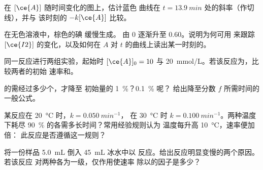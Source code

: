 \begin{exercise}[$\star\star$]\label{exo:g12:reaction-rates:9}
在 $[\ce{A}]$ 随时间变化的图上，估计蓝色
曲线在 $t = \qty{13.9}{min}$ 处的斜率（作切线），并与
该时刻的 $-k[\ce{A}]$ 比较。
\end{exercise}

\begin{exercise}[$\star\star$]\label{exo:g12:reaction-rates:10}
在无色溶液中，棕色的碘  缓慢生成。
由 0 逐渐升至 0.60。说明为何可用
来跟踪 $[\ce{I2}]$ 的变化，以及如何在
$A$ 对 $t$ 的曲线上读出某一时刻的。
\end{exercise}

\begin{exercise}[$\star\star$]\label{exo:g12:reaction-rates:11}
同一反应进行两组实验，起始时 $[\ce{A}]_0 = 10$ 与
\qty{20}{mmol/L}。若该反应为，比较两者的初始
速率和。
\end{exercise}

\begin{exercise}[$\star\star\star$]\label{exo:g12:reaction-rates:12}
的需经过多少个，才降至
初始量的 \qty{1}{\percent}？\qty{0.1}{\percent} 呢？
给出降至分数 $f$ 所需时间的一般公式。
\end{exercise}

\begin{exercise}[$\star\star\star$]\label{exo:g12:reaction-rates:13}
某反应在 \qty{20}{\celsius} 时，$k = \qty{0.050}{min^{-1}}$，
在 \qty{30}{\celsius} 时 $k = \qty{0.100}{min^{-1}}$。两种温度下耗尽
\qty{90}{\percent} 的各需多长时间？常用经验规则认为
温度每升高 \qty{10}{\celsius}，速率便加倍：
此反应是否遵循这一规则？
\end{exercise}

\begin{exercise}[$\star\star\star$]\label{exo:g12:reaction-rates:14}
将一份样品 \qty{5.0}{mL} 倒入 \qty{45}{mL} 冰水中以
反应。给出反应明显变慢的两个原因。若该反应
对两种各为一级，仅作用使速率
除以的因子是多少？
\end{exercise}

